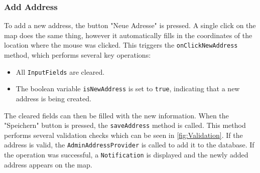 \subsubsection{Add Address}
    \label{fig:Add Address}

    To add a new address, the button "Neue Adresse" is pressed. A single click on the map does the same thing, however it automatically fills in the coordinates of the location where the mouse was clicked. This triggers the \texttt{onClickNewAddress} method, which performs several key operations: 
    
    \begin{itemize}
        \item All \texttt{InputFields} are cleared.
        \item The boolean variable \texttt{isNewAddress} is set to \texttt{true}, indicating that a new address is being created.
    \end{itemize}
    
    The cleared fields can then be filled with the new information. When the "Speichern" button is pressed, the \texttt{saveAddress} method is called. This method performs several validation checks which can be seen in \ref{fig:Validation}. If the address is valid, the \texttt{AdminAddressProvider} is called to add it to the database. If the operation was successful, a \texttt{Notification} is displayed and the newly added address appears on the map.


